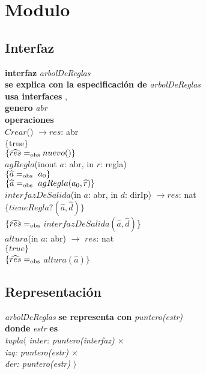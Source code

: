 \section*{Modulo }

\subsection*{Interfaz}
\textbf{interfaz} \textit{arbolDeReglas}\\
\textbf{se explica con la especificaci\'on de} \textit{arbolDeReglas}\\
\textbf{usa interfaces} , \\
\textbf{genero} \textit{abr}\\

\textbf{operaciones}\\
$Crear$() $\longrightarrow res$: abr\\
$\{$true$\}$\\
$\{\widehat{res} =_{\mathrm{obs}} nuevo()\}$\\

$agRegla$(inout $a$: abr, in $r$: regla)\\
$\{\widehat{a} =_{\mathrm{obs}}\ a_0\}$\\
$\{\widehat{a} \igobs\ agRegla(a_0,\widehat{r})\}$\\

$interfazDeSalida$(in $a$: abr, in $d$: dirIp) $\longrightarrow res$: nat\\
$\{tieneRegla?(\widehat{a},\widehat{d})\}$\\
$\{\widehat{res}=_{\mathrm{obs}}$ $interfazDeSalida(\widehat{a},\widehat{d})$\}\\

$altura$(in $a$: abr) $\longrightarrow$	$res$: nat\\
$\{true\}$\\
$\{\widehat{res}=_{\mathrm{obs}}$ $altura(\widehat{a})\}$\\


\subsection*{Representaci\'on}
\textit{arbolDeReglas} \textbf{se representa con} \textit{puntero(estr)}\\
\textbf{donde} \textit{estr} \textbf{es}\\
\textit{tupla$\langle$ inter: puntero(interfaz) $\times$\\
\hspace*{1.1cm}izq: puntero(estr) $\times$\\
\hspace*{1.1cm}der: puntero(estr) $\rangle$}

